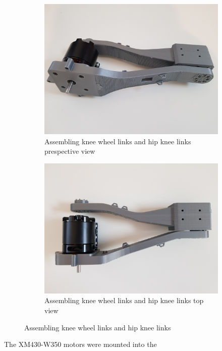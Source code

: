 \begin{figure}[h]
	\centering
	\begin{subfigure}[t]{0.45\textwidth}
		\includegraphics[height=0.7\textwidth]{assembling_knee_wheel_links_and_hip_knee_links_1}
		\caption{Assembling knee wheel links and hip knee links	prespective view}
		\label{fig:assemblingkneewheellinksandhipkneelinksprespectiveview}
	\end{subfigure}
	\begin{subfigure}[t]{0.45\textwidth}
		\includegraphics[height=0.7\textwidth]{assembling_knee_wheel_links_and_hip_knee_links_2}
		\caption{Assembling knee wheel links and hip knee links	top view}
		\label{fig:assemblingkneewheellinksandhipkneelinkstopview}
	\end{subfigure}
	\caption{Assembling knee wheel links and hip knee links}
	\label{fig:Assembling knee wheel links and hip knee links}
\end{figure}
The XM430-W350 motors were mounted into the 


